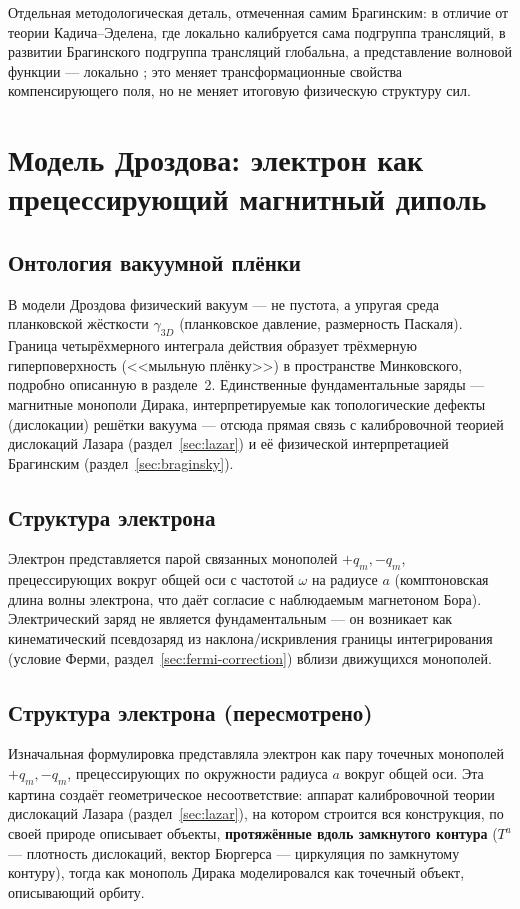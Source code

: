 \documentclass[12pt,a4paper]{article}
\begin{document}
Отдельная методологическая деталь, отмеченная самим Брагинским: в
отличие от теории Кадича--Эделена, где локально калибруется сама
подгруппа трансляций, в развитии Брагинского подгруппа трансляций
глобальна, а представление волновой функции --- локально
\cite{Braginsky2016}; это меняет трансформационные свойства
компенсирующего поля, но не меняет итоговую физическую структуру сил.

\section{Модель Дроздова: электрон как прецессирующий магнитный диполь}
\label{sec:model}

\subsection{Онтология вакуумной плёнки}

В модели Дроздова физический вакуум --- не пустота, а упругая среда
планковской жёсткости $\gamma_{3D}$ (планковское давление, размерность
Паскаля). Граница четырёхмерного интеграла действия образует
трёхмерную гиперповерхность (<<мыльную плёнку>>) в пространстве
Минковского, подробно описанную в разделе~2. Единственные
фундаментальные заряды --- магнитные монополи Дирака, интерпретируемые
как топологические дефекты (дислокации) решётки вакуума --- отсюда
прямая связь с калибровочной теорией дислокаций Лазара
(раздел~\ref{sec:lazar}) и её физической интерпретацией Брагинским
(раздел~\ref{sec:braginsky}).

\subsection{Структура электрона}

Электрон представляется парой связанных монополей $+q_m,-q_m$,
прецессирующих вокруг общей оси с частотой $\omega$ на радиусе $a$
(комптоновская длина волны электрона, что даёт согласие с наблюдаемым
магнетоном Бора). Электрический заряд не является фундаментальным ---
он возникает как кинематический псевдозаряд из наклона/искривления
границы интегрирования (условие Ферми, раздел~\ref{sec:fermi-correction})
вблизи движущихся монополей.

\subsection{Структура электрона (пересмотрено)}

Изначальная формулировка представляла электрон как пару точечных
монополей $+q_m,-q_m$, прецессирующих по окружности радиуса $a$ вокруг
общей оси. Эта картина создаёт геометрическое несоответствие: аппарат
калибровочной теории дислокаций Лазара (раздел~\ref{sec:lazar}), на
котором строится вся конструкция, по своей природе описывает объекты,
\textbf{протяжённые вдоль замкнутого контура} ($T^a$ --- плотность
дислокаций, вектор Бюргерса --- циркуляция по замкнутому контуру),
тогда как монополь Дирака моделировался как точечный объект,
описывающий орбиту.
\end{document}
